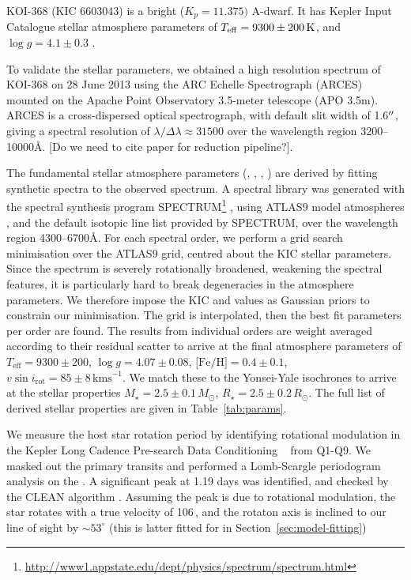 \documentclass[iop]{emulateapj}
\begin{document}
KOI-368 (KIC 6603043) is a bright ($K_p = 11.375)$ A-dwarf. It has Kepler Input Catalogue stellar atmosphere 
parameters of $T_{\rm eff} = 9300\pm200\,{\rm K}$, and $\log g=4.1\pm0.3$ \citep{Pinsonneault:2012}.

To validate the stellar parameters, we obtained a high resolution spectrum of KOI-368 on 28 June 2013 using the 
ARC Echelle Spectrograph (ARCES) mounted on the Apache Point Observatory 3.5-meter telescope (APO 3.5m). ARCES is 
a cross-dispersed optical spectrograph, with default slit width of 1.6$\mbox{$^{\prime\prime}$}$, giving a spectral resolution of 
$\lambda / \Delta \lambda \approx 31500$ over the wavelength region 3200--10000\AA\@. [Do we need to cite paper 
for reduction pipeline?].

The fundamental stellar atmosphere parameters (\teff, \logg, \feh, \vsini) are derived by fitting synthetic spectra 
to the observed spectrum. A spectral library was generated with the spectral synthesis program 
SPECTRUM\footnote{\url{http://www1.appstate.edu/dept/physics/spectrum/spectrum.html}} \citep{GrayCorbally:1994}, 
using ATLAS9 model atmospheres \citep{Castelli:2004}, and the default isotopic line list provided by SPECTRUM, over 
the wavelength region 4300--6700\AA\@. For each spectral order, we perform a grid search \chisq minimisation over the 
ATLAS9 grid, centred about the KIC stellar parameters. Since the spectrum is severely rotationally broadened, weakening the spectral features, it is particularly hard to break degeneracies in the atmosphere parameters. 
We therefore impose the KIC \teff and \logg values as Gaussian priors to constrain our \chisq minimisation. 
The \chisq grid is interpolated, then the best fit parameters per order are found. The results from individual 
orders are weight averaged according to their residual scatter to arrive at the final atmosphere parameters of 
$T_\text{eff} = 9300\pm200$, $\log g = 4.07 \pm 0.08$, $\text{[Fe/H]} = 0.4 \pm 0.1$, $v \sin i_\text{rot} = 85 \pm 8\,\text{kms}^{-1}$.
We match these to the Yonsei-Yale isochrones \citep{Yi:2001} to arrive at the stellar properties 
$M_\star = 2.5 \pm 0.1\,M_\odot$, $R_\star = 2.5 \pm 0.2\,R_\odot$. The full list of derived stellar 
properties are given in Table~\ref{tab:params}.

We measure the host star rotation period by identifying rotational
modulation in the Kepler Long Cadence Pre-search Data Conditioning \lcs\ \citep{Smith:2012} 
from Q1-Q9. We masked out the primary transits and performed a Lomb-Scargle 
periodogram \citep[][]{Lomb1976,Scargle1982} analysis
on the \lcs. A significant peak at 1.19 days was identified,
and checked by the CLEAN algorithm \citep{Roberts1987}. Assuming the peak is due to rotational modulation, the star 
rotates with a true velocity of 106\,\kms, and the rotaton axis is inclined to our line of sight by 
$\sim 53^\circ$ (this is latter fitted for in Section~\ref{sec:model-fitting})
\end{document}
